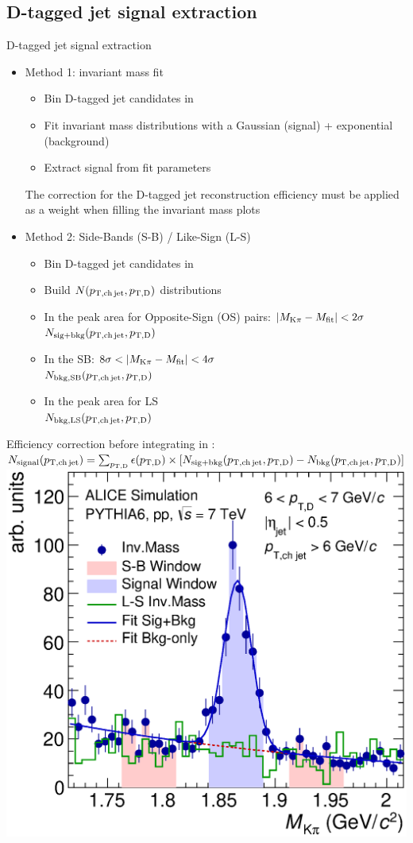 \documentclass{beamer}
\begin{document}
\subsection{D-tagged jet signal extraction}
\begin{frame}{D-tagged jet signal extraction}
\begin{itemize}
\item Method 1: invariant mass fit
\begin{itemize}
\item Bin D-tagged jet candidates in \ptchjet
\item Fit invariant mass distributions with a Gaussian (signal) + exponential (background)
\item Extract signal from fit parameters
\end{itemize}
The correction for the D-tagged jet reconstruction efficiency must be applied 
as a weight when filling the invariant mass plots
\pause
\item Method 2: Side-Bands (S-B) / Like-Sign (L-S)
\begin{itemize}
\item Bin D-tagged jet candidates in \ptd
\item Build $N(p_{\mathrm{T,ch\, jet}}, p_{\mathrm{T,D}})$ distributions
\item In the peak area for Opposite-Sign (OS) pairs: $|M_{\rm K\pi} - M_{\rm fit}| <2\sigma$\\ $N_{\rm sig+bkg} (p_{\mathrm{T,ch\, jet}}, p_{\mathrm{T,D}})$
\item In the SB: $8\sigma <|M_{\rm K\pi} - M_{\rm fit}| < 4\sigma$\\ $N_{\rm bkg, SB} (p_{\mathrm{T,ch\, jet}}, p_{\mathrm{T,D}})$
\item In the peak area for LS \\ $N_{\rm bkg, LS} (p_{\mathrm{T,ch\, jet}}, p_{\mathrm{T,D}})$
\end{itemize}
\end{itemize}
Efficiency correction before integrating in \ptd: $N_{\rm signal} (p_{\mathrm{T,ch\, jet}})=\sum_{p_{\mathrm{T,D}}} \epsilon(p_{\mathrm{T,D}}) \times [N_{\rm sig+bkg}(p_{\mathrm{T,ch\, jet}}, p_{\mathrm{T,D}}) - N_{\rm bkg}(p_{\mathrm{T,ch\, jet}}, p_{\mathrm{T,D}})]$
\includegraphics[width=.3\paperwidth]{img/HQ16_Simulation_InvMassSB}
\end{frame}
\end{document}
